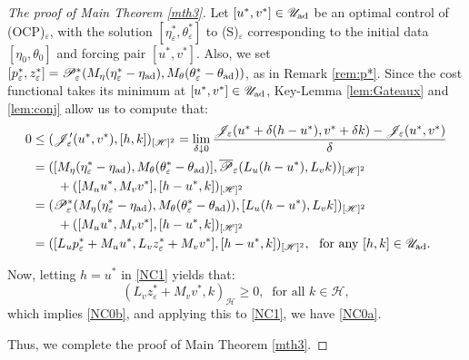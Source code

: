 \documentclass{sinst}
\numberwithin{equation}{section}
\theoremstyle{plain}
\theoremstyle{definition}
\def\sH{\mathscr{H}}
\def\sJ{\mathscr{J}}
\def\sP{\mathscr{P}}
\def\sU{\mathscr{U}}
\def\ad{{\rm ad}}
\begin{document}
\begin{proof}[The proof of Main Theorem \ref{mth3}]
  Let $[u^*,v^*] \in \sU_\ad$ be an optimal control of (OCP)$_\varepsilon$, with the solution $[\eta_\varepsilon^*, \theta_\varepsilon^*]$ to (S)$_\varepsilon$ corresponding to the initial data $[\eta_0, \theta_0]$ and forcing pair $[u^*,v^*]$. Also, we set $[p_\varepsilon^*, z_\varepsilon^*] = \sP_\varepsilon^*(M_\eta(\eta_\varepsilon^* - \eta_\ad), M_\theta(\theta_\varepsilon^* - \theta_\ad))$, as in Remark \ref{rem:p*}. Since the cost functional takes its minimum at $[u^*, v^*] \in \sU_\ad$, Key-Lemma \ref{lem:Gateaux} and \ref{lem:conj} allow us to compute that:
  \begin{align}
    0 &\leq (\sJ_\varepsilon'(u^*,v^*),[h,k])_{[\sH]^2} = \lim_{\delta \downarrow 0} \frac{\sJ_\varepsilon(u^* + \delta(h - u^*), v^* + \delta k) - \sJ_\varepsilon(u^*,v^*)}{\delta}
    \\
    &= ([M_\eta(\eta_\varepsilon^* - \eta_\ad), M_\theta(\theta_\varepsilon^* - \theta_\ad)], \overline{\sP}_\varepsilon(L_u (h - u^*), L_v k))_{[\sH]^2} 
    \\
    &\qquad + ([M_u u^*, M_v v^*], [h - u^*,k])_{[\sH]^2} \label{NC1}
    \\
    &= (\sP_\varepsilon^*(M_\eta(\eta_\varepsilon^* - \eta_\ad), M_\theta(\theta_\varepsilon^* - \theta_\ad)), [L_u (h - u^*), L_v k])_{[\sH]^2} 
    \\
    &\qquad + ([M_u u^*, M_v v^*], [h - u^*,k])_{[\sH]^2}
    \\
    &= ([L_u p_\varepsilon^* + M_u u^*, L_v z_\varepsilon^* + M_v v^*], [h - u^*, k])_{[\sH]^2}, \ \mbox{ for any } [h,k] \in \sU_\ad.
  \end{align}

  Now, letting $h = u^*$ in \eqref{NC1} yields that:  
  \begin{equation}
    (L_v z_\varepsilon^* + M_v v^*, k)_\sH \geq 0, \ \mbox{ for all } k \in \sH, \label{NC2}
  \end{equation}
  which implies \eqref{NC0b}, and applying this to \eqref{NC1}, we have \eqref{NC0a}.

  Thus, we complete the proof of Main Theorem \ref{mth3}.
\end{proof}
\end{document}
